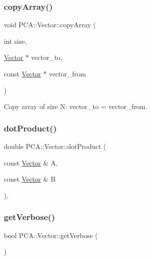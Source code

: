 \subsubsection{\texorpdfstring{copy\+Array()}{copyArray()}}
{\footnotesize\ttfamily void P\+C\+A\+::\+Vector\+::copy\+Array (\begin{DoxyParamCaption}\item[{int}]{size,  }\item[{\hyperlink{class_p_c_a_1_1_vector}{Vector} $\ast$}]{vector\+\_\+to,  }\item[{const \hyperlink{class_p_c_a_1_1_vector}{Vector} $\ast$}]{vector\+\_\+from }\end{DoxyParamCaption})\hspace{0.3cm}{\ttfamily [static]}}



Copy array of size N\+: vector\+\_\+to = vector\+\_\+from. 

\hypertarget{class_p_c_a_1_1_vector_abc89550f2ef587f808a7fea91259a22a}{}\label{class_p_c_a_1_1_vector_abc89550f2ef587f808a7fea91259a22a} 
\subsubsection{\texorpdfstring{dot\+Product()}{dotProduct()}}
{\footnotesize\ttfamily double P\+C\+A\+::\+Vector\+::dot\+Product (\begin{DoxyParamCaption}\item[{const \hyperlink{class_p_c_a_1_1_vector}{Vector} \&}]{A,  }\item[{const \hyperlink{class_p_c_a_1_1_vector}{Vector} \&}]{B }\end{DoxyParamCaption})\hspace{0.3cm}{\ttfamily [inline]}, {\ttfamily [static]}}

\hypertarget{class_p_c_a_1_1_vector_a06b3f5087a02159bee1f49401db7aad3}{}\label{class_p_c_a_1_1_vector_a06b3f5087a02159bee1f49401db7aad3} 
\subsubsection{\texorpdfstring{get\+Verbose()}{getVerbose()}}
{\footnotesize\ttfamily bool P\+C\+A\+::\+Vector\+::get\+Verbose (\begin{DoxyParamCaption}{ }\end{DoxyParamCaption})\hspace{0.3cm}{\ttfamily [static]}}

